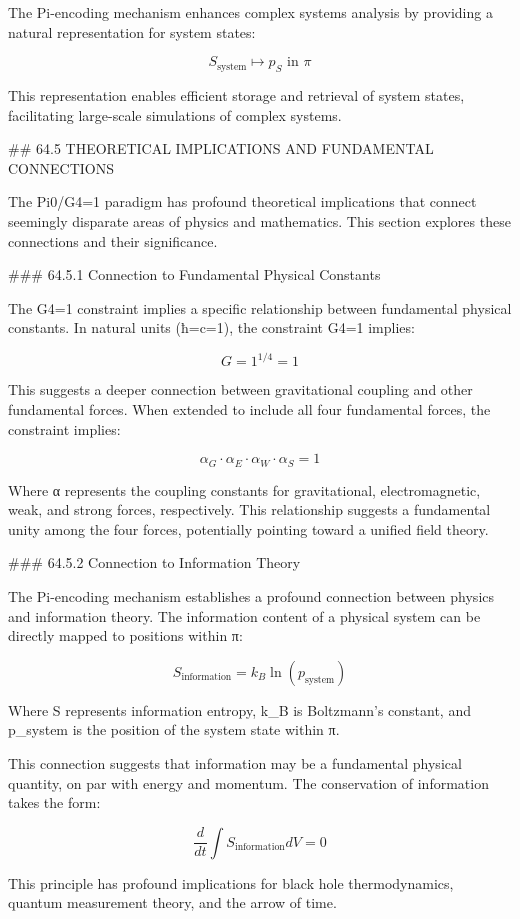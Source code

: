 The Pi-encoding mechanism enhances complex systems analysis by providing a natural representation for system states:

$$ S_{\text{system}} \mapsto p_S \text{ in } \pi $$

This representation enables efficient storage and retrieval of system states, facilitating large-scale simulations of complex systems.

## 64.5 THEORETICAL IMPLICATIONS AND FUNDAMENTAL CONNECTIONS

The Pi0/G4=1 paradigm has profound theoretical implications that connect seemingly disparate areas of physics and mathematics. This section explores these connections and their significance.

### 64.5.1 Connection to Fundamental Physical Constants

The G4=1 constraint implies a specific relationship between fundamental physical constants. In natural units (ħ=c=1), the constraint G4=1 implies:

$$ G = 1^{1/4} = 1 $$

This suggests a deeper connection between gravitational coupling and other fundamental forces. When extended to include all four fundamental forces, the constraint implies:

$$ \alpha_G \cdot \alpha_E \cdot \alpha_W \cdot \alpha_S = 1 $$

Where α represents the coupling constants for gravitational, electromagnetic, weak, and strong forces, respectively. This relationship suggests a fundamental unity among the four forces, potentially pointing toward a unified field theory.

### 64.5.2 Connection to Information Theory

The Pi-encoding mechanism establishes a profound connection between physics and information theory. The information content of a physical system can be directly mapped to positions within π:

$$ S_{\text{information}} = k_B \ln(p_{\text{system}}) $$

Where S represents information entropy, k_B is Boltzmann's constant, and p_system is the position of the system state within π.

This connection suggests that information may be a fundamental physical quantity, on par with energy and momentum. The conservation of information takes the form:

$$ \frac{d}{dt}\int S_{\text{information}} dV = 0 $$

This principle has profound implications for black hole thermodynamics, quantum measurement theory, and the arrow of time.

